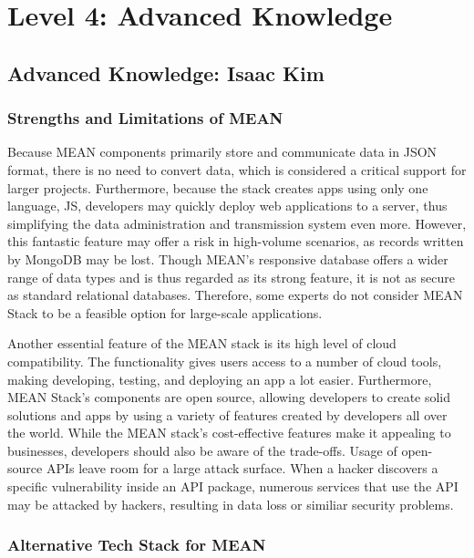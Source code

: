 \documentclass[a4paper, 11pt]{report}
\begin{document}

\newpage
\section{Level 4: Advanced Knowledge}

\subsection{Advanced Knowledge: Isaac Kim}

\subsubsection{Strengths and Limitations of MEAN}

Because MEAN components primarily store and communicate data in JSON format, there is no need to convert data, which is considered a critical support for larger projects. \cite{isaac13} Furthermore, because the stack creates apps using only one language, JS, developers may quickly deploy web applications to a server, thus simplifying the data administration and transmission system even more. \cite{isaac13} However, this fantastic feature may offer a risk in high-volume scenarios, as records written by MongoDB may be lost. Though MEAN’s responsive database offers a wider range of data types and is thus regarded as its strong feature, it is not as secure as standard relational databases. \cite{isaac13} Therefore, some experts do not consider MEAN Stack to be a feasible option for large-scale applications.

Another essential feature of the MEAN stack is its high level of cloud compatibility. The functionality gives users access to a number of cloud tools, making developing, testing, and deploying an app a lot easier. Furthermore, \cite{isaac13} MEAN Stack's components are open source, allowing developers to create solid solutions and apps by using a variety of features created by developers all over the world. \cite{isaac13}  While the MEAN stack's cost-effective features make it appealing to businesses, developers should also be aware of the trade-offs. Usage of open-source APIs leave room for a large attack surface. When a hacker discovers a specific vulnerability inside an API package, numerous services that use the API may be attacked by hackers, resulting in data loss or similiar security problems.\cite{isaac13} 


\subsubsection{Alternative Tech Stack for MEAN}
\end{document}
